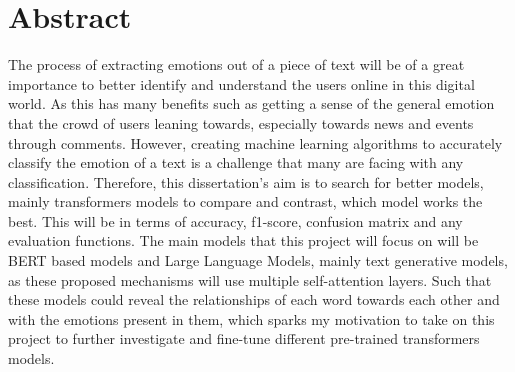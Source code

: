
\chapter*{Abstract}

The process of extracting emotions out of a piece of text will be of a great importance to better identify and understand the users online in this digital world. As this has many benefits such as getting a sense of the general emotion that the crowd of users leaning towards, especially towards news and events through comments. However, creating machine learning algorithms to accurately classify the emotion of a text is a challenge that
many are facing with any classification. Therefore, this dissertation's aim is to search for better models, mainly transformers models to compare and contrast,
which model works the best. This will be in terms of accuracy, f1-score, confusion matrix and any evaluation functions. The main models that this project will focus on will be BERT based models and Large Language Models, mainly text generative models, as these proposed mechanisms will use multiple self-attention layers. Such that these models could reveal the relationships of each word towards each other and with the emotions present in them, which sparks my motivation to take on this project to further investigate and fine-tune different pre-trained transformers models.